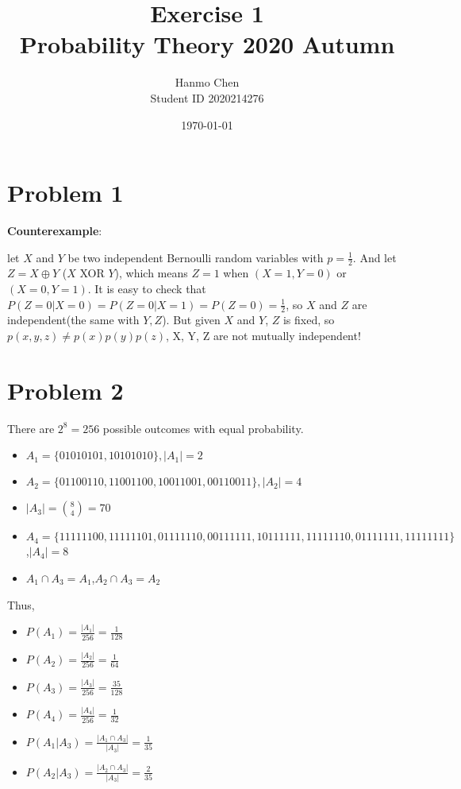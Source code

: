\documentclass{article}
\title{Exercise 1 \\ Probability Theory 2020 Autumn}
\author{Hanmo Chen \\ Student ID 2020214276}
\date{\today}
\begin{document}
\maketitle

\tableofcontents

\pagebreak
\section{Problem 1}

\textbf{Counterexample}: 

let $X$ and $Y$ be two independent Bernoulli random variables with $p = \frac 1 2$. And let $Z = X \oplus Y$ ($X$ XOR $Y$), which means $Z = 1$ when $(X=1,Y=0)$ or $(X=0,Y=1)$. It is easy to check that $P(Z=0|X=0) = P(Z=0|X=1) = P(Z=0) = \frac 1 2$, so $X$ and $Z$ are independent(the same with $Y,Z$). But given $X$ and $Y$,  $Z$ is fixed, so $p(x,y,z)\neq p(x)p(y)p(z)$, X, Y, Z are not mutually independent!




\section{Problem 2}

There are $2^8 = 256$ possible outcomes with equal probability.

\begin{itemize}
    \item $A_1 = \{01010101,10101010\},|A_1| = 2$
    \item $A_2 = \{01100110,11001100,10011001,00110011\},|A_2| = 4$ 
    \item $|A_3| = \binom{8}{4} = 70$
    \item $A_4 = \{11111100,11111101,01111110,00111111,10111111,11111110,01111111,11111111\}$,$|A_4| = 8$  
    \item $A_1\cap A_3 = A_1$,$A_2\cap A_3 = A_2$
\end{itemize}

Thus, 

\begin{itemize}
    \item $P(A_1) = \frac {|A_1|}{256} = \frac {1}{128}$
    \item $P(A_2) = \frac {|A_2|}{256} = \frac {1}{64}$
    \item $P(A_3) = \frac {|A_3|}{256} = \frac {35}{128}$
    \item $P(A_4) = \frac {|A_4|}{256} = \frac {1}{32}$
    \item $P(A_1|A_3) = \frac {|A_1\cap A_3|}{|A_3|} = \frac {1}{35}$
    \item $P(A_2|A_3) = \frac {|A_2\cap A_3|}{|A_3|} = \frac {2}{35}$
\end{itemize}
\end{document}
